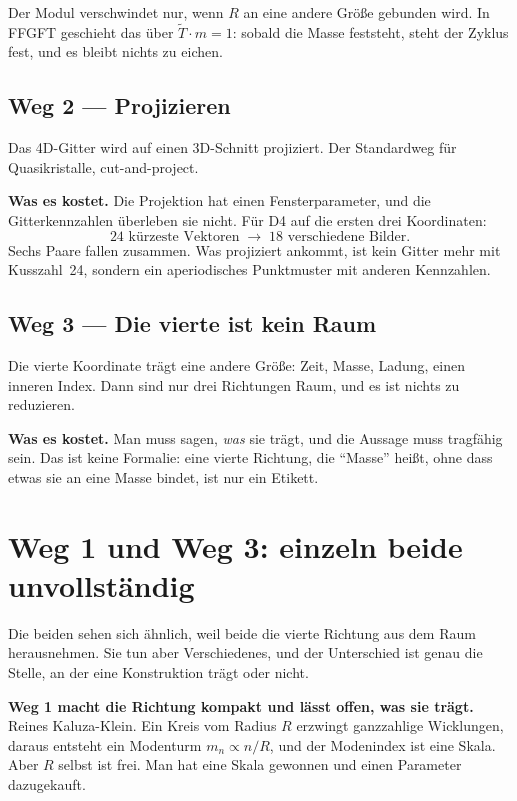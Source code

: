 Der Modul verschwindet nur, wenn $R$ an eine andere Größe gebunden
wird. In FFGFT geschieht das über $\tilde T \cdot m = 1$: sobald die
Masse feststeht, steht der Zyklus fest, und es bleibt nichts zu eichen.

\section{Weg 2 --- Projizieren}

Das 4D-Gitter wird auf einen 3D-Schnitt projiziert. Der Standardweg für
Quasikristalle, cut-and-project.

\textbf{Was es kostet.} Die Projektion hat einen Fensterparameter, und
die Gitterkennzahlen überleben sie nicht. Für D4 auf die ersten drei
Koordinaten:
\[
  24 \text{ kürzeste Vektoren} \;\longrightarrow\; 18 \text{ verschiedene Bilder.}
\]
Sechs Paare fallen zusammen. Was projiziert ankommt, ist kein Gitter
mehr mit Kusszahl~24, sondern ein aperiodisches Punktmuster mit anderen
Kennzahlen.

\section{Weg 3 --- Die vierte ist kein Raum}

Die vierte Koordinate trägt eine andere Größe: Zeit, Masse, Ladung,
einen inneren Index. Dann sind nur drei Richtungen Raum, und es ist
nichts zu reduzieren.

\textbf{Was es kostet.} Man muss sagen, \emph{was} sie trägt, und die
Aussage muss tragfähig sein. Das ist keine Formalie: eine vierte
Richtung, die \enquote{Masse} heißt, ohne dass etwas sie an eine Masse
bindet, ist nur ein Etikett.

\chapter{Weg 1 und Weg 3: einzeln beide unvollständig}

Die beiden sehen sich ähnlich, weil beide die vierte Richtung aus dem
Raum herausnehmen. Sie tun aber Verschiedenes, und der Unterschied ist
genau die Stelle, an der eine Konstruktion trägt oder nicht.

\textbf{Weg 1 macht die Richtung kompakt und lässt offen, was sie
trägt.} Reines Kaluza-Klein. Ein Kreis vom Radius $R$ erzwingt
ganzzahlige Wicklungen, daraus entsteht ein Modenturm
$m_n \propto n/R$, und der Modenindex ist eine Skala. Aber $R$ selbst
ist frei. Man hat eine Skala gewonnen und einen Parameter dazugekauft.

